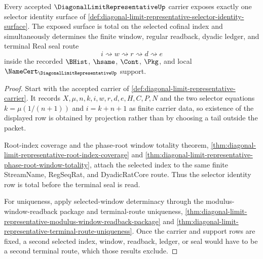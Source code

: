 \begin{theorem}
\label{thm:diagonal-limit-representative-selector-identity-totality}
Every accepted $\DiagonalLimitRepresentativeUp$ carrier exposes exactly one selector identity surface of \autoref{def:diagonal-limit-representative-selector-identity-surface}. The exposed surface is total on the selected cofinal index and simultaneously determines the finite window, regular readback, dyadic ledger, and terminal Real seal route
$$
i \rightsquigarrow w \rightsquigarrow r \rightsquigarrow d \rightsquigarrow e
$$
inside the recorded $\BHist$, $\hsame$, $\Cont$, $\Pkg$, and local $\NameCert_{\DiagonalLimitRepresentativeUp}$ support.
\end{theorem}
\begin{proof}
Start with the accepted carrier of \autoref{def:diagonal-limit-representative-carrier}. It records $X,\mu,n,k,i,w,r,d,e,H,C,P,N$ and the two selector equations $k=\mu(1/(n+1))$ and $i=k+n+1$ as finite carrier data, so existence of the displayed row is obtained by projection rather than by choosing a tail outside the packet.

Root-index coverage and the phase-root window totality theorem, \autoref{thm:diagonal-limit-representative-root-index-coverage} and \autoref{thm:diagonal-limit-representative-phase-root-window-totality}, attach the selected index to the same finite StreamName, RegSeqRat, and DyadicRatCore route. Thus the selector identity row is total before the terminal seal is read.

For uniqueness, apply selected-window determinacy through the modulus-window-readback package and terminal-route uniqueness, \autoref{thm:diagonal-limit-representative-modulus-window-readback-package} and \autoref{thm:diagonal-limit-representative-terminal-route-uniqueness}. Once the carrier and support rows are fixed, a second selected index, window, readback, ledger, or seal would have to be a second terminal route, which those results exclude.
\end{proof}

